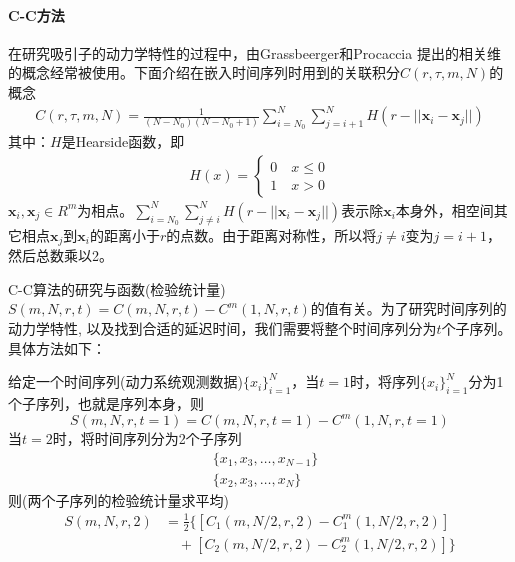             \paragraph{C-C方法}
            在研究吸引子的动力学特性的过程中，由Grassbeerger和Procaccia 提出的相关维的概念经常被使用。下面介绍在嵌入时间序列时用到的关联积分$C(r,\tau, m, N)$的概念
            \begin{align}
                \label{关联积分}
                C(r,\tau, m, N) = \frac{1}{(N-N_0) (N - N_0 + 1)} \sum_{i=N_0}^N \sum_{j = i + 1} ^N H(r - ||\mathbf{x}_i - \mathbf{x}_j||)
            \end{align}
            \noindent 其中：$H$是Hearside函数，即
            \begin{align*}
                H(x) =
                \left\{
                    \begin{aligned}
                        0 \quad x\leq 0\\
                        1 \quad x>0
                    \end{aligned}
                \right.
            \end{align*}
            $\mathbf{x}_i,\mathbf{x}_j \in R^m$为相点。$\sum_{i=N_0}^N \sum_{j \neq i} ^N H(r - ||\mathbf{x}_i - \mathbf{x}_j||)$表示除$\mathbf{x}_i$本身外，相空间其它相点$\mathbf{x}_j$到$\mathbf{x}_i$的距离小于$r$的点数。由于距离对称性，所以将$j \neq i$变为$j = i + 1$，然后总数乘以2。
            \par
            C-C算法的研究与函数(检验统计量)$S(m,N,r,t) = C(m,N,r,t) - C^m(1,N,r,t)$的值有关。为了研究时间序列的动力学特性, 以及找到合适的延迟时间，我们需要将整个时间序列分为$t$个子序列。具体方法如下：
            \par
            给定一个时间序列(动力系统观测数据)$\{x_i\}_{i=1}^N$，当$t = 1$时，将序列$\{x_i\}_{i=1}^N$分为1个子序列，也就是序列本身，则
            \[
                S(m,N,r,t = 1) = C(m,N,r,t = 1) - C^m(1,N,r,t = 1)
            \]
            当$ t=2 $时，将时间序列分为2个子序列
            \begin{align*}
                & \{x_1,x_3,\dots,x_{N-1}\} \\
                & \{x_2,x_3,\dots,x_{N}\}
            \end{align*}
            则(两个子序列的检验统计量求平均)
            \begin{align*}
                S(m,N,r,2) &= \frac{1}{2} \{[C_1(m,N/2,r,2) - C_1^m(1,N/2,r,2)] \\
                           &\quad + [C_2(m,N/2,r,2) - C_2^m(1,N/2,r,2)]\}
            \end{align*}
